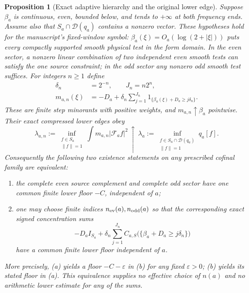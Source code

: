 \documentclass[11pt]{article}
\newtheorem{proposition}[theorem]{Proposition}
\theoremstyle{remark}
\begin{document}
\begin{proposition}[Exact adaptive hierarchy and the original lower edge]
\label{ns43-conc-prop-adaptive}
Suppose $\beta_a$ is continuous, even, bounded below, and tends to
$+\infty$ at both frequency ends. Assume also that
$S_a\cap\mathcal D(q_a)$ contains a nonzero vector.
These hypotheses hold for the manuscript's fixed-window symbol:
$\beta_a(\xi)=O_a(\log(2+|\xi|))$ puts every compactly supported
smooth physical test in the form domain. In the even sector, a
nonzero linear combination of two independent even smooth tests
can satisfy the one source constraint; in the odd sector any
nonzero odd smooth test suffices. For integers $n\ge1$ define
\begin{align*}
 \delta_n&=2^{-n},\qquad J_n=n2^n,\\
 m_{a,n}(\xi)&=-D_a+
 \delta_n\sum_{j=1}^{J_n}
       1_{\{\beta_a(\xi)+D_a\ge j\delta_n\}}.
\end{align*}
These are finite step minorants with positive weights, and
$m_{a,n}\uparrow\beta_a$ pointwise. Their exact compressed lower
edges obey
\begin{equation}\label{ns43-conc-eq-edge-limit}
 \lambda_{a,n}:=\inf_{\substack{f\in S_a\\\|f\|=1}}
   \int m_{a,n}|\mathcal F_af|^2
 \ \uparrow\
 \lambda_a:=\inf_{\substack{f\in S_a\cap\mathcal D(q_a)\\\|f\|=1}}
   q_a[f].
\end{equation}
Consequently the following two existence statements on any prescribed
cofinal family are equivalent:
\begin{enumerate}[label=(\alph*)]
\item the complete even source complement and complete odd sector
have one common finite lower floor $-C$, independent of $a$;
\item one may choose finite indices $n_{\rm ev}(a),n_{\rm odd}(a)$
so that the corresponding exact signed concentration sums
\[
 -D_a I_{S_a}+\delta_n\sum_{j=1}^{J_n}
 C_{a,S}\bigl(\{\beta_a+D_a\ge j\delta_n\}\bigr)
\]
have a common finite lower floor independent of $a$.
\end{enumerate}
More precisely, (a) yields a floor $-C-\varepsilon$ in (b) for any
fixed $\varepsilon>0$; (b) yields its stated floor in (a).
This equivalence supplies no effective choice of $n(a)$ and no
arithmetic lower estimate for any of the sums.
\end{proposition}
\end{document}
